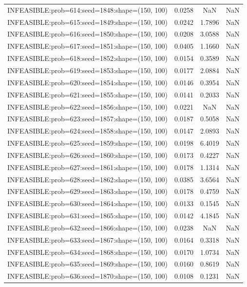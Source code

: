 \begin{longtable}{lccc}
INFEASIBLE:prob=614:seed=1848:shape=(150, 100) & 0.0258 &     NaN &    NaN \\
INFEASIBLE:prob=615:seed=1849:shape=(150, 100) & 0.0242 &  1.7896 &    NaN \\
INFEASIBLE:prob=616:seed=1850:shape=(150, 100) & 0.0208 &  3.0588 &    NaN \\
INFEASIBLE:prob=617:seed=1851:shape=(150, 100) & 0.0405 &  1.1660 &    NaN \\
INFEASIBLE:prob=618:seed=1852:shape=(150, 100) & 0.0154 &  0.3589 &    NaN \\
INFEASIBLE:prob=619:seed=1853:shape=(150, 100) & 0.0177 &  2.0884 &    NaN \\
INFEASIBLE:prob=620:seed=1854:shape=(150, 100) & 0.0146 &  0.3954 &    NaN \\
INFEASIBLE:prob=621:seed=1855:shape=(150, 100) & 0.0141 &  0.2033 &    NaN \\
INFEASIBLE:prob=622:seed=1856:shape=(150, 100) & 0.0221 &     NaN &    NaN \\
INFEASIBLE:prob=623:seed=1857:shape=(150, 100) & 0.0187 &  0.5058 &    NaN \\
INFEASIBLE:prob=624:seed=1858:shape=(150, 100) & 0.0147 &  2.0893 &    NaN \\
INFEASIBLE:prob=625:seed=1859:shape=(150, 100) & 0.0198 &  6.4019 &    NaN \\
INFEASIBLE:prob=626:seed=1860:shape=(150, 100) & 0.0173 &  0.4227 &    NaN \\
INFEASIBLE:prob=627:seed=1861:shape=(150, 100) & 0.0178 &  1.1314 &    NaN \\
INFEASIBLE:prob=628:seed=1862:shape=(150, 100) & 0.0385 &  3.6564 &    NaN \\
INFEASIBLE:prob=629:seed=1863:shape=(150, 100) & 0.0178 &  0.4759 &    NaN \\
INFEASIBLE:prob=630:seed=1864:shape=(150, 100) & 0.0133 &  0.1545 &    NaN \\
INFEASIBLE:prob=631:seed=1865:shape=(150, 100) & 0.0142 &  4.1845 &    NaN \\
INFEASIBLE:prob=632:seed=1866:shape=(150, 100) & 0.0238 &     NaN &    NaN \\
INFEASIBLE:prob=633:seed=1867:shape=(150, 100) & 0.0164 &  0.3318 &    NaN \\
INFEASIBLE:prob=634:seed=1868:shape=(150, 100) & 0.0170 &  1.0734 &    NaN \\
INFEASIBLE:prob=635:seed=1869:shape=(150, 100) & 0.0160 &  0.8619 &    NaN \\
INFEASIBLE:prob=636:seed=1870:shape=(150, 100) & 0.0108 &  0.1231 &    NaN \\

\end{longtable}
